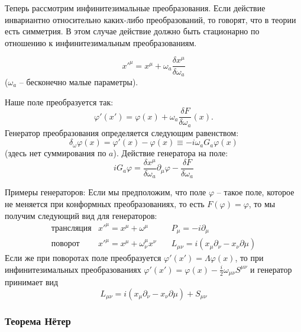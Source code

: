 \documentclass[a4paper,12pt]{article}
\theoremstyle{definition}
\theoremstyle{definition}
\theoremstyle{definition}
\begin{document}
Теперь рассмотрим инфинитезимальные преобразования.
Если действие инвариантно относительно каких-либо преобразований, то говорят, что в теории есть симметрия. В этом случае действие должно быть стационарно по отношению к инфинитезимальным преобразованиям.

\begin{equation}
  \label{eq:165}
  x'^{\mu}=x^{\mu}+\omega_a \frac{\delta x^{\mu}}{\delta \omega_a}
\end{equation}
($\omega_{a}$ -- бесконечно малые параметры).

Наше поле преобразуется так:
\begin{equation}
  \label{eq:166}
  \varphi'(x')=\varphi(x)+\omega_a \frac{\delta F}{\delta \omega_a} (x).
\end{equation}
Генератор преобразования определяется следующим равенством:
\begin{equation}
  \label{eq:167}
  \delta_{\omega} \varphi(x)=\varphi'(x)-\varphi(x)\equiv -i\omega_a G_a \varphi(x)
\end{equation}
(здесь нет суммирования по $a$). Действие генератора на поле:
\begin{equation}
  \label{eq:168}
  iG_a \varphi=\frac{\delta x^{\mu}}{\delta\omega_a} \partial_{\mu}\varphi-\frac{\delta F}{\delta \omega_a}
\end{equation}

Примеры генераторов:
Если мы предположим, что поле $\varphi$ -- такое поле, которое не меняется при конформных преобразованиях, то есть $F(\varphi)=\varphi$, то мы получим следующий вид для генераторов:
\begin{eqnarray}
  \label{eq:169}
  \mbox{трансляция}  & x'^{\mu}=x^{\mu}+\omega^{\mu}& \quad P_{\mu}=-i\partial_{\mu}\\
  \mbox{поворот} & x'^{\mu}=x^{\mu}+\omega^{\mu}_{\nu}x^{\nu} & \quad L_{\mu\nu}=i(x_{\mu}\partial_{\nu}-x_{\nu}\partial{\mu})
\end{eqnarray}
Если же при поворотах поле преобразуется $\varphi'(x')=\Lambda\varphi(x)$, то при инфинитезимальных преобразованиях $\varphi'(x')=\varphi(x)-\frac{i}{2}\omega_{\mu\nu}S^{\mu\nu}$ и генератор принимает вид
\begin{equation*}
  L_{\mu\nu}=i(x_{\mu}\partial_{\nu}-x_{\nu}\partial{\mu})+S_{\mu\nu}
\end{equation*}

\subsubsection*{Теорема Нётер}
\label{sec:noether}
\end{document}
